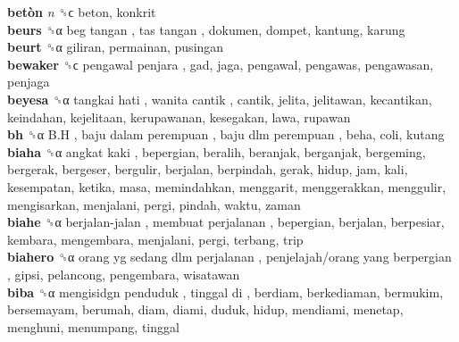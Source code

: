 \textbf{betòn} \emph{n}  ␝ϲ  beton, konkrit  \\
\textbf{beurs} ␝α   beg tangan ,  tas tangan , dokumen, dompet, kantung, karung  \\
\textbf{beurt} ␝α  giliran, permainan, pusingan  \\
\textbf{bewaker} ␝ϲ   pengawal penjara , gad, jaga, pengawal, pengawas, pengawasan, penjaga  \\
\textbf{beyesa} ␝α   tangkai hati ,  wanita cantik , cantik, jelita, jelitawan, kecantikan, keindahan, kejelitaan, kerupawanan, kesegakan, lawa, rupawan  \\
\textbf{bh} ␝α   B.H ,  baju dalam perempuan ,  baju dlm perempuan , beha, coli, kutang  \\
\textbf{biaha} ␝α   angkat kaki , bepergian, beralih, beranjak, berganjak, bergeming, bergerak, bergeser, bergulir, berjalan, berpindah, gerak, hidup, jam, kali, kesempatan, ketika, masa, memindahkan, menggarit, menggerakkan, menggulir, mengisarkan, menjalani, pergi, pindah, waktu, zaman  \\
\textbf{biahe} ␝α   berjalan-jalan ,  membuat perjalanan , bepergian, berjalan, berpesiar, kembara, mengembara, menjalani, pergi, terbang, trip  \\
\textbf{biahero} ␝α   orang yg sedang dlm perjalanan ,  penjelajah/orang yang berpergian , gipsi, pelancong, pengembara, wisatawan  \\
\textbf{biba} ␝α   mengisidgn penduduk ,  tinggal di , berdiam, berkediaman, bermukim, bersemayam, berumah, diam, diami, duduk, hidup, mendiami, menetap, menghuni, menumpang, tinggal  \\
